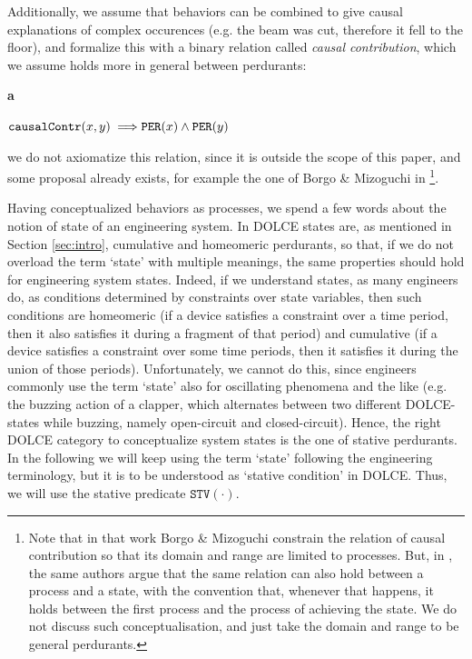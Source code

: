 \documentclass[sw]{iosart2x}
\newcommand{\bflist}{\begin{list}{}{\setlength{\topsep}{2mm}\setlength{\partopsep}{0mm}\setlength{\parsep}{0mm}\setlength{\leftmargin}{9mm}\setlength{\labelwidth}{8mm}}}
\newcommand{\eflist}{\end{list}}
\newcommand{\AxLabel}{\textrm{a}}
\newcounter{cntax}
\newcommand{\myax}[1]{\refstepcounter{cntax}\begin{small}{\bf \AxLabel\thecntax\label{ax:#1}}\end{small}}
\newcommand{\generalStyle}[1]{\texttt{#1}}
\newcommand{\biRel}[3]{\generalStyle{#1}(#2,#3)}
\newcommand{\uniRel}[2]{\generalStyle{#1}(#2)}
\newcommand{\myfi}{\hspace{0.9mm} \Longrightarrow}
\newcommand{\DOLCE}{\textsc{DOLCE}\xspace} %
\newcommand{\DOLCEPerdurant}[1]{\uniRel{{PER}}{#1}}
\newcommand{\DOLCEStative}[1]{\uniRel{{STV}}{#1}}
\newcommand{\causallyContr}[2]{\biRel{causalContr}{#1}{#2}}
\newcommand{\firstTimeKeyWord}[1]{\textit{#1}}
\newcommand{\quotes}[1]{`#1'}
\begin{document}
Additionally, we assume that behaviors can be combined to give causal explanations of complex occurences (e.g. the beam was cut, therefore it fell to the floor), and formalize this with a binary relation called \firstTimeKeyWord{causal contribution}, which we assume holds more in general between perdurants:
\bflist
  \item[\myax{contribRange}] $ \causallyContr{x}{y} \myfi \DOLCEPerdurant{x} \land \DOLCEPerdurant{y} $
\eflist
we do not axiomatize this relation, since it is outside the scope of this paper, and some proposal already exists, for example the one of Borgo \& Mizoguchi in \cite{borgoFirstorderFormalizationEvent2014}\footnote{Note that in that work Borgo \& Mizoguchi constrain the relation of causal contribution so that its domain and range are limited to processes. But, in \cite{mizoguchiUnifyingDefinitionArtifact2016}, the same authors argue that the same relation can also hold between a process and a state, with the convention that, whenever that happens, it holds between the first process and the process of achieving the state.
We do not discuss such conceptualisation, and just take the domain and range to be general perdurants.}.

Having conceptualized behaviors as processes, we spend a few words about the notion of state of an engineering system.
In \DOLCE states are, as mentioned in Section \ref{sec:intro}, cumulative and homeomeric perdurants, so that, if we do not overload the term \quotes{state} with multiple meanings, the same properties should hold for engineering system states.
Indeed, if we understand states, as many engineers do, as conditions determined by constraints over state variables, then such conditions are homeomeric (if a device satisfies a constraint over a time period, then it also satisfies it during a fragment of that period) and cumulative (if a device satisfies a constraint over some time periods, then it satisfies it during the union of those periods).
Unfortunately, we cannot do this, since engineers commonly use the term \quotes{state} also for oscillating phenomena and the like (e.g. the buzzing action of a clapper, which alternates between two different \DOLCE-states while buzzing, namely open-circuit and closed-circuit). 
Hence, the right \DOLCE category to conceptualize system states is the one of stative perdurants. 
In the following we will keep using the term \quotes{state} following the engineering terminology, but it is to be understood as \quotes{stative condition} in \DOLCE. Thus, we will use the stative predicate $\DOLCEStative{\cdot}$.
\end{document}
